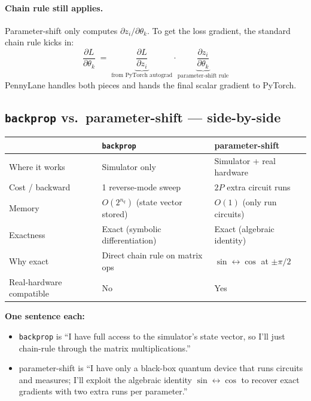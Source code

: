 \documentclass[11pt,a4paper]{article}
\begin{document}
\paragraph{Chain rule still applies.} Parameter-shift only computes $\partial z_i / \partial \theta_k$. To get the loss gradient, the standard chain rule kicks in:
\[
  \frac{\partial L}{\partial \theta_k} \;=\; \underbrace{\frac{\partial L}{\partial z_i}}_{\text{from PyTorch autograd}} \cdot \underbrace{\frac{\partial z_i}{\partial \theta_k}}_{\text{parameter-shift rule}}
\]
PennyLane handles both pieces and hands the final scalar gradient to PyTorch.

\subsection{\texttt{backprop} vs.\ parameter-shift --- side-by-side}

\begin{center}
\begin{tabular}{@{}lll@{}}
\toprule
                            & \texttt{backprop}                          & parameter-shift \\
\midrule
Where it works              & Simulator only                              & Simulator + real hardware \\
Cost / backward             & 1 reverse-mode sweep                        & $2P$ extra circuit runs \\
Memory                      & $O(2^{n_q})$ (state vector stored)          & $O(1)$ (only run circuits) \\
Exactness                   & Exact (symbolic differentiation)            & Exact (algebraic identity) \\
Why exact                   & Direct chain rule on matrix ops             & $\sin \leftrightarrow \cos$ at $\pm\pi/2$ \\
Real-hardware compatible    & No                                           & Yes \\
\bottomrule
\end{tabular}
\end{center}

\textbf{One sentence each:}
\begin{itemize}
  \item \texttt{backprop} is ``I have full access to the simulator's state vector, so I'll just chain-rule through the matrix multiplications.''
  \item parameter-shift is ``I have only a black-box quantum device that runs circuits and measures; I'll exploit the algebraic identity $\sin \leftrightarrow \cos$ to recover exact gradients with two extra runs per parameter.''
\end{itemize}
\end{document}
